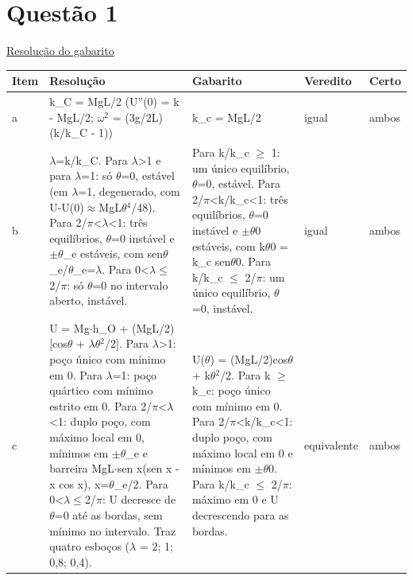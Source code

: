 \documentclass{article}%
\begin{document}
\section*{Questão 1}%
\href{https://poliedroresolve.sistemapoliedro.com.br/vestibulares/ita/2027/ita-2-fase-dia-3-22-10-2026-2-fase-dia-3/dissertativa-1-fisica-2-fase-dia-3-ita-2027}{Resolução do gabarito}\par\smallskip%
\begin{longtable}{@{}p{} p{} p{} p{} p{}@{}}\toprule Item & Resolução & Gabarito & Veredito & Certo \\ \midrule
a & k\_C = MgL/2 (U''(0) = k - MgL/2; $\omega$$^2$ = (3g/2L)(k/k\_C - 1)) & k\_c = MgL/2 & igual & ambos \\
b & $\lambda$=k/k\_C. Para $\lambda$>1 e para $\lambda$=1: só $\theta$=0, estável (em $\lambda$=1, degenerado, com U-U(0)$\approx$MgL$\theta$$^{4}$/48). Para 2/$\pi$<$\lambda$<1: três equilíbrios, $\theta$=0 instável e $\pm$$\theta$\_e estáveis, com sen$\theta$\_e/$\theta$\_e=$\lambda$. Para 0<$\lambda$$\leq$2/$\pi$: só $\theta$=0 no intervalo aberto, instável. & Para k/k\_c $\geq$ 1: um único equilíbrio, $\theta$=0, estável. Para 2/$\pi$<k/k\_c<1: três equilíbrios, $\theta$=0 instável e $\pm$$\theta$0 estáveis, com k$\theta$0 = k\_c sen$\theta$0. Para k/k\_c $\leq$ 2/$\pi$: um único equilíbrio, $\theta$=0, instável. & igual & ambos \\
c & U = Mg$\cdot$h\_O + (MgL/2){[}cos$\theta$ + $\lambda$$\theta$$^2$/2{]}. Para $\lambda$>1: poço único com mínimo em 0. Para $\lambda$=1: poço quártico com mínimo estrito em 0. Para 2/$\pi$<$\lambda$<1: duplo poço, com máximo local em 0, mínimos em $\pm$$\theta$\_e e barreira MgL$\cdot$sen x(sen x - x cos x), x=$\theta$\_e/2. Para 0<$\lambda$$\leq$2/$\pi$: U decresce de $\theta$=0 até as bordas, sem mínimo no intervalo. Traz quatro esboços ($\lambda$ = 2; 1; 0,8; 0,4). & U($\theta$) = (MgL/2)cos$\theta$ + k$\theta$$^2$/2. Para k $\geq$ k\_c: poço único com mínimo em 0. Para 2/$\pi$<k/k\_c<1: duplo poço, com máximo local em 0 e mínimos em $\pm$$\theta$0. Para k/k\_c $\leq$ 2/$\pi$: máximo em 0 e U decrescendo para as bordas. & equivalente & ambos \\
\bottomrule\end{longtable}%
\end{document}
